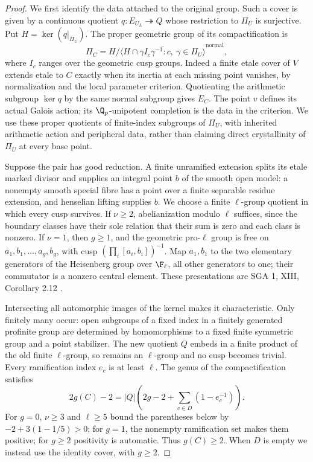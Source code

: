 \begin{proof}
We first identify the data attached to the original group. Such a cover
is given by a continuous quotient $q:E_{U_L}\twoheadrightarrow Q$
whose restriction to $\Pi_U$ is surjective. Put $H=\ker(q|_{\Pi_U})$.
The proper geometric group of its compactification is
\[
 \Pi_C=H\big/\overline{\langle H\cap\gamma I_c\gamma^{-1}:
                 c,\ \gamma\in\Pi_U\rangle}^{\mathrm{normal}},
                                                               \tag{B.11d.1}
\]
where $I_c$ ranges over the geometric cusp groups. Indeed a finite
etale cover of $V$ extends etale to $C$ exactly when its inertia at
each missing point vanishes, by normalization and the local parameter
criterion. Quotienting the arithmetic subgroup $\ker q$ by the same
normal subgroup gives $E_C$. The point $v$ defines its actual Galois
action; its $\Q_p$-unipotent completion is the data in the criterion.
We use these proper quotients of finite-index subgroups of $\Pi_U$,
with inherited arithmetic action and peripheral data, rather than
claiming direct crystallinity of $\Pi_U$ at every base point.

Suppose the pair has good reduction. A finite unramified extension
splits its etale marked divisor and supplies an integral point $b$ of
the smooth open model: a nonempty smooth special fibre has a point
over a finite separable residue extension, and henselian lifting
supplies $b$. We choose a finite $\ell$-group quotient in which every
cusp survives. If $\nu\ge2$, abelianization modulo $\ell$ suffices,
since the boundary classes have their sole relation that their sum is
zero and each class is nonzero. If $\nu=1$, then $g\ge1$, and the
geometric pro-$\ell$ group is free on $a_1,b_1,\ldots,a_g,b_g$,
with cusp $(\prod_i[a_i,b_i])^{-1}$. Map $a_1,b_1$ to the two
elementary generators of the Heisenberg group over $\F_\ell$, all
other generators to one; their commutator is a nonzero central element.
These presentations are SGA 1, XIII, Corollary 2.12 \citep{BC_SGA1}.

Intersecting all automorphic images of the kernel makes it
characteristic. Only finitely many occur: open subgroups of a fixed
index in a finitely generated profinite group are determined by
homomorphisms to a fixed finite symmetric group and a point stabilizer.
The new quotient $Q$ embeds in a finite product of the old finite
$\ell$-group, so remains an $\ell$-group and no cusp becomes trivial.
Every ramification index $e_c$ is at least $\ell$. The genus of the
compactification satisfies
\[
 2g(C)-2=|Q|\left(2g-2+\sum_{c\in D}(1-e_c^{-1})\right).
                                                               \tag{B.11d.2}
\]
For $g=0$, $\nu\ge3$ and $\ell\ge5$ bound the parentheses below by
$-2+3(1-1/5)>0$; for $g=1$, the nonempty ramification set makes them
positive; for $g\ge2$ positivity is automatic. Thus $g(C)\ge2$.
When $D$ is empty we instead use the identity cover, with $g\ge2$.


\end{proof}
